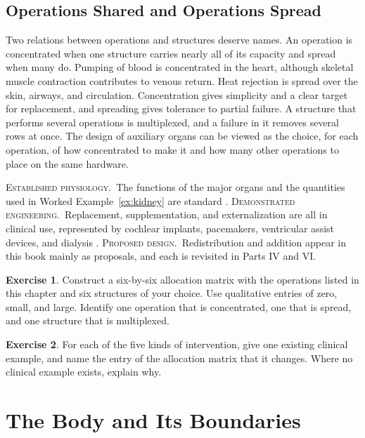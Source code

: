 \documentclass[11pt,openany]{book}
\theoremstyle{definition}
\newtheorem{exercise}{Exercise}[chapter]
\theoremstyle{remark}
\newcommand{\est}{\textsc{Established physiology.}\ }
\newcommand{\dem}{\textsc{Demonstrated engineering.}\ }
\newcommand{\pro}{\textsc{Proposed design.}\ }
\begin{document}
\section{Operations Shared and Operations Spread}

Two relations between operations and structures deserve names. An operation is concentrated when one structure carries nearly all of its capacity and spread when many do. Pumping of blood is concentrated in the heart, although skeletal muscle contraction contributes to venous return. Heat rejection is spread over the skin, airways, and circulation. Concentration gives simplicity and a clear target for replacement, and spreading gives tolerance to partial failure. A structure that performs several operations is multiplexed, and a failure in it removes several rows at once. The design of auxiliary organs can be viewed as the choice, for each operation, of how concentrated to make it and how many other operations to place on the same hardware.

\begin{evidence}
\est The functions of the major organs and the quantities used in Worked Example~\ref{ex:kidney} are standard \cite{boron2017}. \dem Replacement, supplementation, and externalization are all in clinical use, represented by cochlear implants, pacemakers, ventricular assist devices, and dialysis \cite{mehra2017}. \pro Redistribution and addition appear in this book mainly as proposals, and each is revisited in Parts IV and VI.
\end{evidence}

\begin{exercise}
Construct a six-by-six allocation matrix with the operations listed in this chapter and six structures of your choice. Use qualitative entries of zero, small, and large. Identify one operation that is concentrated, one that is spread, and one structure that is multiplexed.
\end{exercise}

\begin{exercise}
For each of the five kinds of intervention, give one existing clinical example, and name the entry of the allocation matrix that it changes. Where no clinical example exists, explain why.
\end{exercise}

\chapter{The Body and Its Boundaries}
\label{ch:boundaries}
\end{document}

